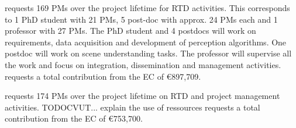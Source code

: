 \CLUJ requests 169 PMs over the project lifetime for RTD activities. This
corresponds to 1 PhD student with 21 PMs, 5 post-doc with approx. 24 PMs
each and 1 professor with 27 PMs. The PhD student and 4 postdocs will
work on requirements, data acquisition and development of perception
algorithms. One postdoc will work on scene understanding tasks. The
professor will supervise all the work and focus on integration,
dissemination and management activities. \CLUJ requests a total contribution from the EC of \euro 897,709.

\PRAGUE requests 174 PMs over the project lifetime on RTD and project management activities. TODOCVUT... explain the use of ressources \PRAGUE requests a total contribution from the EC of \euro 753,700.